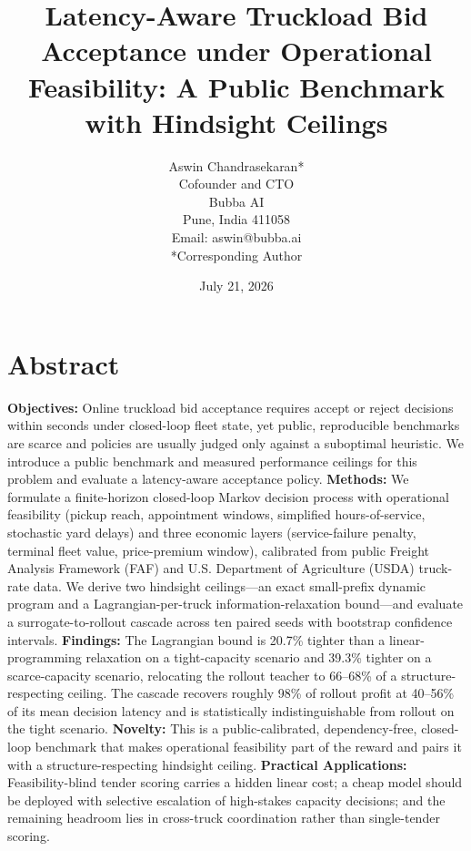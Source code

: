 \documentclass[numbered]{trbunofficial}
\title{Latency-Aware Truckload Bid Acceptance under Operational
Feasibility: A Public Benchmark with Hindsight Ceilings}
\author{%
Aswin Chandrasekaran*\\
Cofounder and CTO\\
Bubba AI\\
Pune, India 411058\\
Email: aswin@bubba.ai\\[6pt]
*Corresponding Author%
}
\date{July 21, 2026}
\begin{document}
\maketitle

\section*{Abstract}
\textbf{Objectives:} Online truckload bid acceptance requires accept or
reject decisions within seconds under closed-loop fleet state, yet public,
reproducible benchmarks are scarce and policies are usually judged only
against a suboptimal heuristic. We introduce a public benchmark and
measured performance ceilings for this problem and evaluate a
latency-aware acceptance policy.
\textbf{Methods:} We formulate a finite-horizon closed-loop Markov decision
process with operational feasibility (pickup reach, appointment windows,
simplified hours-of-service, stochastic yard delays) and three economic
layers (service-failure penalty, terminal fleet value, price-premium
window), calibrated from public Freight Analysis Framework (FAF) and
U.S. Department of Agriculture (USDA) truck-rate data. We derive two
hindsight ceilings---an exact small-prefix dynamic program and a
Lagrangian-per-truck information-relaxation bound---and evaluate a
surrogate-to-rollout cascade across ten paired seeds with bootstrap
confidence intervals.
\textbf{Findings:} The Lagrangian bound is 20.7\% tighter than a
linear-programming relaxation on a tight-capacity scenario and 39.3\% tighter on a
scarce-capacity scenario, relocating the rollout teacher to 66--68\% of a
structure-respecting ceiling. The cascade recovers roughly 98\% of rollout
profit at 40--56\% of its mean decision latency and is statistically
indistinguishable from rollout on the tight scenario.
\textbf{Novelty:} This is a public-calibrated, dependency-free, closed-loop
benchmark that makes operational feasibility part of the reward and pairs
it with a structure-respecting hindsight ceiling.
\textbf{Practical Applications:} Feasibility-blind tender scoring carries a
hidden linear cost; a cheap model should be deployed with selective
escalation of high-stakes capacity decisions; and the remaining headroom
lies in cross-truck coordination rather than single-tender scoring.

\newpage
\end{document}
